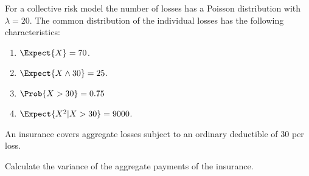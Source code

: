  For a collective risk model the number of losses has a Poisson distribution 
with $\lambda = 20$. The common distribution of the individual losses has 
the following characteristics:
\begin{enumerate}
\item $\Expect{X}=70$.
\item $\Expect{X\wedge 30}=25$.
\item $\Prob{X>30}=0.75$
\item $\Expect{X^2|X>30}=9000$.
\end{enumerate}
An insurance covers aggregate losses subject to an ordinary deductible of 
30 per loss.

Calculate the variance of the aggregate payments of the insurance.
